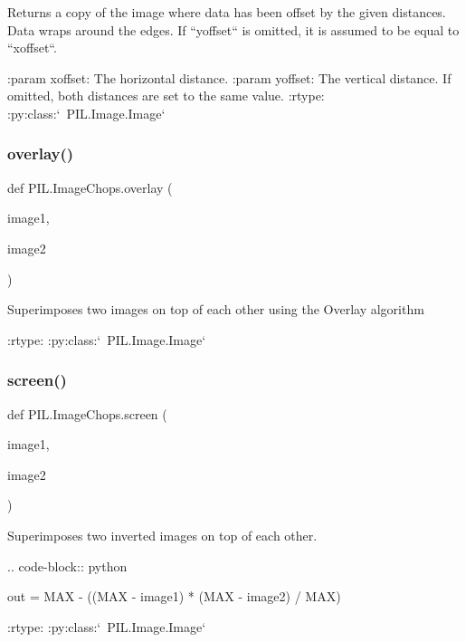 \begin{DoxyVerb}Returns a copy of the image where data has been offset by the given
distances. Data wraps around the edges. If ``yoffset`` is omitted, it
is assumed to be equal to ``xoffset``.

:param xoffset: The horizontal distance.
:param yoffset: The vertical distance.  If omitted, both
    distances are set to the same value.
:rtype: :py:class:`~PIL.Image.Image`
\end{DoxyVerb}
 \mbox{\label{namespacePIL_1_1ImageChops_a42606e8a79999207f1f09c7129d78362}} 
\subsubsection{\texorpdfstring{overlay()}{overlay()}}
{\footnotesize\ttfamily def P\+I\+L.\+Image\+Chops.\+overlay (\begin{DoxyParamCaption}\item[{}]{image1,  }\item[{}]{image2 }\end{DoxyParamCaption})}

\begin{DoxyVerb}Superimposes two images on top of each other using the Overlay algorithm

:rtype: :py:class:`~PIL.Image.Image`
\end{DoxyVerb}
 \mbox{\label{namespacePIL_1_1ImageChops_a9064f4f8184020483ffc7ea98509a4af}} 
\subsubsection{\texorpdfstring{screen()}{screen()}}
{\footnotesize\ttfamily def P\+I\+L.\+Image\+Chops.\+screen (\begin{DoxyParamCaption}\item[{}]{image1,  }\item[{}]{image2 }\end{DoxyParamCaption})}

\begin{DoxyVerb}Superimposes two inverted images on top of each other.

.. code-block:: python

    out = MAX - ((MAX - image1) * (MAX - image2) / MAX)

:rtype: :py:class:`~PIL.Image.Image`
\end{DoxyVerb}
 \mbox{\label{namespacePIL_1_1ImageChops_a23c9f4fef663a1548c2380cc91097831}} 
